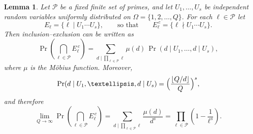 \documentclass[10pt,a4paper]{amsart}
\newtheorem{lemma}{Lemma}
\begin{document}
\begin{lemma}
\label{lem:IE-mobius-finite-primes}
Let $\mathcal{P}$ be a fixed finite set of primes, and let $U_1,\dots,U_s$ be independent random
variables uniformly distributed on $\Omega=\{1,2,\dots,Q\}$. For each $\ell\in\mathcal{P}$ let
\[
E_\ell = \{\ell \mid U_1\cdots U_s\},
\qquad\text{so that}\qquad
E_\ell^{\,c}=\{\ell \nmid U_1\cdots U_s\}.
\]
Then inclusion--exclusion can be written as
\[
\Pr\!\left(\bigcap_{\ell\in\mathcal{P}} E_\ell^{\,c}\right)
=\sum_{d\mid \prod_{\ell\in\mathcal{P}}\ell} \mu(d)\,\Pr(d\mid U_1,\dots,d\mid U_s),
\]
where $\mu$ is the M\"obius function. Moreover,
\[
\Pr(d\mid U_1,\dots,d\mid U_s)=\Bigl(\frac{\lfloor Q/d\rfloor}{Q}\Bigr)^s,
\]
and therefore
\[
\lim_{Q\to\infty}\Pr\!\left(\bigcap_{\ell\in\mathcal{P}} E_\ell^{\,c}\right)
=\sum_{d\mid \prod_{\ell\in\mathcal{P}}\ell}\frac{\mu(d)}{d^s}
=\prod_{\ell\in\mathcal{P}}\left(1-\frac{1}{\ell^s}\right).
\]
\end{lemma}
\end{document}

